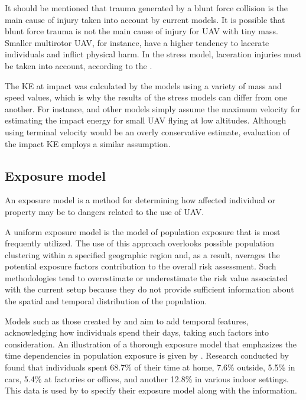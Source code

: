\documentclass[12pt]{report}
\begin{document}
            It should be mentioned that trauma generated by a blunt force collision is the main cause of injury taken
            into account by current models. It is possible that blunt force trauma is not the main cause of injury for
            UAV with tiny mass. Smaller multirotor UAV, for instance, have a higher tendency to lacerate individuals and
            inflict physical harm. In the stress model, laceration injuries must be taken into account, according to the
            \cite{small_aviation_2009}.

            The KE at impact was calculated by the models using a variety of mass and speed values, which is why the
            results of the stress models can differ from one another. For instance, \cite{ancel_real-time_2017} and
            other models simply assume the maximum velocity for estimating the impact energy for small UAV flying at low
            altitudes. Although using terminal velocity would be an overly conservative estimate, \cite{dalamagkidis_evaluating_2008} evaluation of the
            impact KE employs a similar assumption.

        \subsection{Exposure model}
            An exposure model is a method for determining how affected individual or property may be to dangers related
            to the use of UAV.

            A uniform exposure model is the model of population exposure that is most frequently utilized. The use of
            this approach overlooks possible population clustering within a specified geographic region and, as a
            result, averages the potential exposure factors contribution to the overall risk assessment. Such
            methodologies tend to overestimate or underestimate the risk value associated with the current setup because
            they do not provide sufficient information about the spatial and temporal distribution of the population.

            Models such as those created by \cite{burke_system-level_2011} and \cite{melnyk_third-party_2014} aim to add temporal features, acknowledging how individuals
            spend their days, taking such factors into consideration. An illustration of a thorough exposure model that
            emphasizes the time dependencies in population exposure is given by \cite{melnyk_third-party_2014}. Research conducted by \cite{klepeis_national_2001} found
            that individuals spent 68.7\% of their time at home, 7.6\% outside, 5.5\% in cars, 5.4\% at factories or
            offices, and another 12.8\% in various indoor settings. This data is used by \cite{melnyk_third-party_2014} to specify their exposure
            model along with the information.
\end{document}

